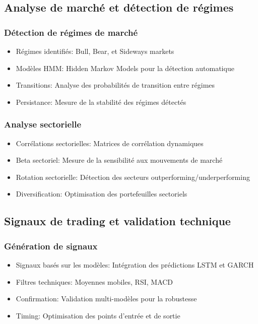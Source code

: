 \subsection{Analyse de marché et détection de régimes}
\subsubsection{Détection de régimes de marché}
\begin{itemize}
    \item Régimes identifiés: Bull, Bear, et Sideways markets
    \item Modèles HMM: Hidden Markov Models pour la détection automatique
    \item Transitions: Analyse des probabilités de transition entre régimes
    \item Persistance: Mesure de la stabilité des régimes détectés
\end{itemize}

\subsubsection{Analyse sectorielle}
\begin{itemize}
    \item Corrélations sectorielles: Matrices de corrélation dynamiques
    \item Beta sectoriel: Mesure de la sensibilité aux mouvements de marché
    \item Rotation sectorielle: Détection des secteurs outperforming/underperforming
    \item Diversification: Optimisation des portefeuilles sectoriels
\end{itemize}

\subsection{Signaux de trading et validation technique}
\subsubsection{Génération de signaux}
\begin{itemize}
    \item Signaux basés sur les modèles: Intégration des prédictions LSTM et GARCH
    \item Filtres techniques: Moyennes mobiles, RSI, MACD
    \item Confirmation: Validation multi-modèles pour la robustesse
    \item Timing: Optimisation des points d'entrée et de sortie
\end{itemize}

